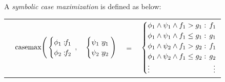 \documentclass{article} %
\newcommand{\casemax}{\mathrm{casemax}}
\begin{document}
A \emph{symbolic case maximization} is defined as below:
\vspace{-4mm}
{\footnotesize
\vspace{-2mm}
\begin{center}
\begin{tabular}{r c c c l}
&
\hspace{-7mm} $\casemax \Bigg(
  \begin{cases}
    \phi_1: \hspace{-2mm} & \hspace{-2mm} f_1 \\ 
    \phi_2: \hspace{-2mm} & \hspace{-2mm} f_2 \\ 
  \end{cases}$
$,$
&
\hspace{-4mm}
  $\begin{cases}
    \psi_1: \hspace{-2mm} & \hspace{-2mm} g_1 \\ 
    \psi_2: \hspace{-2mm} & \hspace{-2mm} g_2 \\ 
  \end{cases} \Bigg)$
&
\hspace{-4mm} 
$ = $
&
\hspace{-4mm}
  $\begin{cases}
  \phi_1 \wedge \psi_1 \wedge f_1 > g_1    : & \hspace{-2mm} f_1 \\ 
  \phi_1 \wedge \psi_1 \wedge f_1 \leq g_1 : & \hspace{-2mm} g_1 \\ 
  \phi_1 \wedge \psi_2 \wedge f_1 > g_2    : & \hspace{-2mm}f_1 \\ 
  \phi_1 \wedge \psi_2 \wedge f_1 \leq g_2 : & \hspace{-2mm} g_2 \\ 
  \vdots & \vdots
  \end{cases}$
\end{tabular}
\end{center}
\vspace{-3mm}
}
\end{document}
